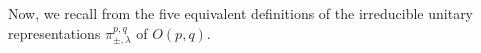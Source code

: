 \documentclass[reqno,12pt]{pja00} %
\newtheorem{remark}[theorem]{Remark}
\theoremstyle{definition}
\theoremstyle{exampstyle} \newtheorem{examp}[theorem]{Theorem}
\renewcommand{\ss}{//}
\begin{document}
Now, we recall from \cite{KO2} the five equivalent definitions of the
irreducible unitary representations $\pi_{\pm,\lambda}^{p,q}$ of $O(p,q)$.
\end{document}
